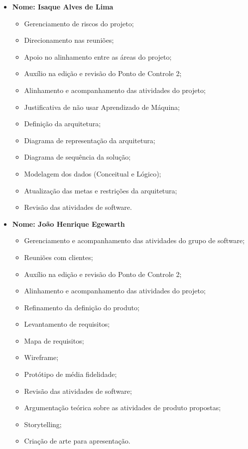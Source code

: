 \begin{itemize}
    
    \item \textbf{Nome: Isaque Alves de Lima}
    \begin{itemize}
    \item Gerenciamento de riscos do projeto;
    \item Direcionamento nas reuniões;
    \item Apoio no alinhamento entre as áreas do projeto;
    \item Auxílio na edição e revisão do Ponto de Controle 2;
    \item Alinhamento e acompanhamento das atividades do projeto;
    \item Justificativa de não usar Aprendizado de Máquina;
    \item Definição da arquitetura;
    \item Diagrama de representação da arquitetura;
    \item Diagrama de sequência da solução;
    \item Modelagem dos dados (Conceitual e Lógico);
    \item Atualização das metas e restrições da arquitetura;
    \item Revisão das atividades de software.
    \end{itemize}
    
    
    \item \textbf{Nome: João Henrique Egewarth}
    \begin{itemize}
    \item Gerenciamento e acompanhamento das atividades do grupo de software;
    \item Reuniões com clientes;
    \item Auxílio na edição e revisão do Ponto de Controle 2;
    \item Alinhamento e acompanhamento das atividades do projeto;
    \item Refinamento da definição do produto;
    \item Levantamento de requisitos;
    \item Mapa de requisitos;
    \item Wireframe;
    \item Protótipo de média fidelidade;
    \item Revisão das atividades de software;
    \item Argumentação teórica sobre as atividades de produto propostas;
    \item Storytelling;
    \item Criação de arte para apresentação.
    \end{itemize}
    

\end{itemize}
